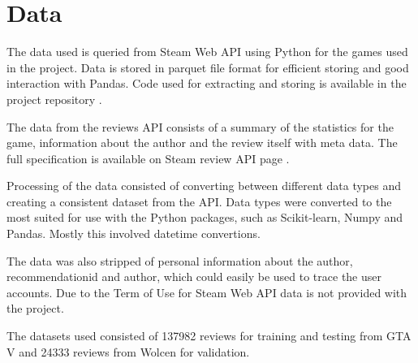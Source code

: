 \chapter{Data}
\label{cha:data}

The data used is queried from Steam Web API \cite{steamworks} using Python for the games used in the project. 
Data is stored in parquet file format \cite{apacheparquet} for efficient storing and good interaction with Pandas.
Code used for extracting and storing is available in the project repository \cite{repository}.

The data from the reviews API consists of a summary of the statistics for the game, information about the author and the review itself with meta data. 
The full specification is available on Steam review API page \cite{steamworks}.

Processing of the data consisted of converting between different data types and creating a consistent dataset from the API. 
Data types were converted to the most suited for use with the Python packages, such as Scikit-learn, Numpy and Pandas.
Mostly this involved datetime convertions.

The data was also stripped of personal information about the author, recommendationid and author, which could easily be used to trace the user accounts.
Due to the Term of Use for Steam Web API \cite{steamapi} data is not provided with the project.

The datasets used consisted of 137982 reviews for training and testing from GTA V and 24333 reviews from Wolcen for validation. 